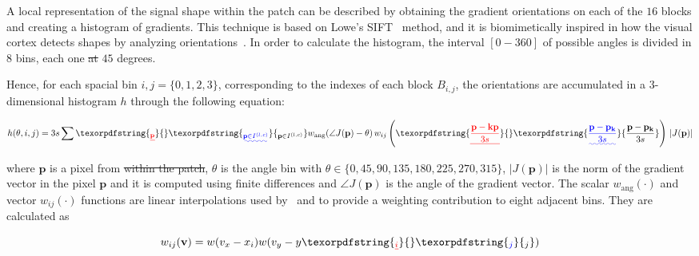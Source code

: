 \documentclass[utf8]{frontiersSCNS} %
\providecommand{\DIFaddtex}[1]{{\protect\color{blue}\uwave{#1}}} %
\providecommand{\DIFdeltex}[1]{{\protect\color{red}\sout{#1}}}                      %
\providecommand{\DIFaddbegin}{} %
\providecommand{\DIFaddend}{} %
\providecommand{\DIFdelbegin}{} %
\providecommand{\DIFdelend}{} %
\providecommand{\DIFadd}[1]{\texorpdfstring{\DIFaddtex{#1}}{#1}} %
\providecommand{\DIFdel}[1]{\texorpdfstring{\DIFdeltex{#1}}{}} %
\begin{document}
A local representation of the signal shape within the patch can be described by obtaining the gradient orientations on each of the $16$ blocks \DIFaddbegin \DIFadd{$B_{i,j}$  with $ 0 \leq i,j \leq 3$ }\DIFaddend and creating a histogram of gradients.  This technique is based on Lowe's SIFT~\citep{Lowe2004} method, and it is biomimetically inspired in how the visual cortex detects shapes by analyzing orientations~\citep{cogprints561}.   In order to calculate the histogram, the interval \DIFdelbegin \DIFdel{$[0-360]$ }\DIFdelend \DIFaddbegin \DIFadd{$[0,360]$ }\DIFaddend of possible angles is divided in $8$ bins, each one \DIFdelbegin \DIFdel{at }\DIFdelend \DIFaddbegin \DIFadd{of }\DIFaddend $45$ degrees.

 Hence, for each spacial bin \DIFdelbegin \DIFdel{$ i,j = \{0,1,2,3\} $}\DIFdelend \DIFaddbegin \DIFadd{$ 0 \leq i,j \leq 3$}\DIFaddend , corresponding to the indexes of each block $B_{i,j}$,  the orientations are accumulated in a  $3$-dimensional histogram $h$ through the following equation: 


\begin{equation}
 h(\theta,i,j) = 3 s \sum\DIFdelbegin \DIFdel{_{\mathbf{p}} }\DIFdelend \DIFaddbegin \DIFadd{_{\mathbf{p} \in I^{(l,c)}} }\DIFaddend w_\mathrm{ang}(\angle J(\mathbf{p}) - \theta)\, w_{ij}\left(\DIFdelbegin \DIFdel{\frac{\mathbf{p} - \mathbf{kp}}{3 s}}\DIFdelend \DIFaddbegin \DIFadd{\frac{\mathbf{p} - \mathbf{p_k}}{3 s}}\DIFaddend \right)\, |J(\mathbf{p})|
\label{eq:histogram}
\end{equation}

\noindent  where $\mathbf{p}$ is a pixel from \DIFdelbegin \DIFdel{within the patch}\DIFdelend \DIFaddbegin \DIFadd{the image $I^{(l,c)}$}\DIFaddend ,  $\theta$ is the angle bin with $ \theta \in \{0, 45, 90, 135, 180, 225, 270, 315\} $,  $ |J(\mathbf{p})| $ is the norm of the gradient vector in the pixel $\mathbf{p}$ and it is computed using finite differences and $\angle J(\mathbf{p}) $ is the angle of the gradient vector.  The scalar $ w_\mathrm{ang}(\cdot) $  and vector $ w_{ij}(\cdot) $ functions are linear interpolations used by~\cite{Lowe2004} and \cite{Vedaldi2010} to provide a weighting contribution to eight adjacent bins.  They are calculated as  

\begin{equation}
 w_{ij}(\mathbf{v}) = w( v_x - x_i ) w( v_y - y\DIFdelbegin \DIFdel{_i }\DIFdelend \DIFaddbegin \DIFadd{_j }\DIFaddend ) 
\label{eq:ij}
\end{equation}
\end{document}
